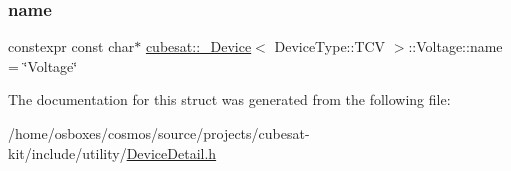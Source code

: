 \subsubsection{\texorpdfstring{name}{name}}
{\footnotesize\ttfamily constexpr const char$\ast$ \hyperlink{structcubesat_1_1__Device}{cubesat\+::\+\_\+\+Device}$<$ Device\+Type\+::\+T\+CV $>$\+::Voltage\+::name = \char`\"{}Voltage\char`\"{}\hspace{0.3cm}{\ttfamily [static]}}



The documentation for this struct was generated from the following file\+:\begin{DoxyCompactItemize}
\item 
/home/osboxes/cosmos/source/projects/cubesat-\/kit/include/utility/\hyperlink{DeviceDetail_8h}{Device\+Detail.\+h}\end{DoxyCompactItemize}
